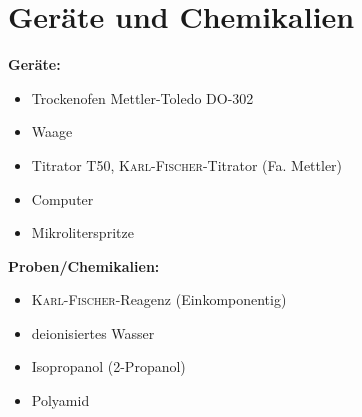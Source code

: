 \newpage
\section{Geräte und Chemikalien}
\label{sec:geraete}

\textbf{Geräte:}
\begin{itemize}
\item Trockenofen Mettler-Toledo DO-302
\item Waage
\item Titrator T50, \textsc{Karl-Fischer}-Titrator (Fa. Mettler)
\item Computer
\item Mikroliterspritze
\end{itemize}

\vspace*{5mm}

\textbf{Proben/Chemikalien:}
\begin{itemize}
\item \textsc{Karl-Fischer}-Reagenz (Einkomponentig)
\item deionisiertes Wasser
\item Isopropanol (2-Propanol)
\item Polyamid

\end{itemize}





